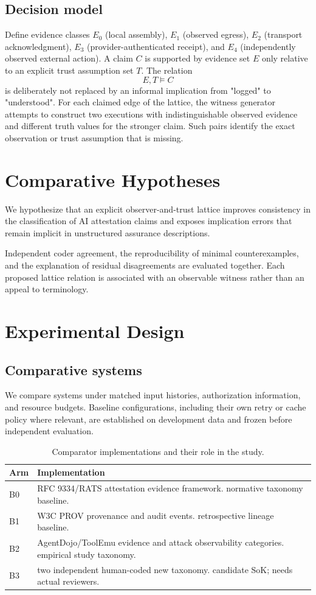 \documentclass[11pt,a4paper]{article}
\begin{document}
\subsection{Decision model}
Define evidence classes $E_0$ (local assembly), $E_1$ (observed egress), $E_2$ (transport acknowledgment), $E_3$ (provider-authenticated receipt), and $E_4$ (independently observed external action). A claim $C$ is supported by evidence set $E$ only relative to an explicit trust assumption set $T$. The relation
\begin{equation}
E,T\models C
\end{equation}
is deliberately not replaced by an informal implication from "logged" to "understood". For each claimed edge of the lattice, the witness generator attempts to construct two executions with indistinguishable observed evidence and different truth values for the stronger claim. Such pairs identify the exact observation or trust assumption that is missing.

\section{Comparative Hypotheses}
We hypothesize that an explicit observer-and-trust lattice improves consistency in the classification of AI attestation claims and exposes implication errors that remain implicit in unstructured assurance descriptions.

Independent coder agreement, the reproducibility of minimal counterexamples, and the explanation of residual disagreements are evaluated together. Each proposed lattice relation is associated with an observable witness rather than an appeal to terminology.

\section{Experimental Design}
\subsection{Comparative systems}
We compare systems under matched input histories, authorization information, and resource budgets. Baseline configurations, including their own retry or cache policy where relevant, are established on development data and frozen before independent evaluation.
\begin{table}[ht]
\centering\footnotesize
\caption{Comparator implementations and their role in the study.}
\begin{tabularx}{\linewidth}{@{}lX@{}}\toprule
Arm & Implementation \\ \midrule
B0 & RFC 9334/RATS attestation evidence framework. normative taxonomy baseline. \\ 
B1 & W3C PROV provenance and audit events. retrospective lineage baseline. \\ 
B2 & AgentDojo/ToolEmu evidence and attack observability categories. empirical study taxonomy. \\ 
B3 & two independent human-coded new taxonomy. candidate SoK; needs actual reviewers. \\ 
\bottomrule\end{tabularx}
\end{table}
\end{document}
